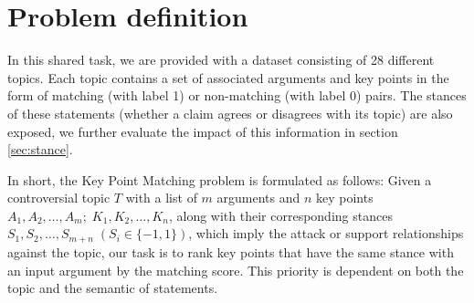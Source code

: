 \section{Problem definition}
\label{sec:problem}
In this shared task, we are provided with a dataset consisting of 28 different topics. Each topic contains a set of associated arguments and key points in the form of matching (with label 1) or non-matching (with label 0) pairs. The stances of these statements (whether a claim agrees or disagrees with its topic) are also exposed, we further evaluate the impact of this information in section \ref{sec:stance}.

In short, the Key Point Matching problem is formulated as follows: Given a controversial topic $T$ with a list of $m$ arguments and $n$ key points $A_1, A_2, \dots, A_m ;\;K_1, K_2, \dots, K_n$, along with their corresponding stances $S_1, S_2, \dots, S_{m+n} \; (S_i \in \{-1, 1\})$, which imply the attack or support relationships against the topic, our task is to rank key points that have the same stance with an input argument by the matching score. This priority is dependent on both the topic and the semantic of statements.


